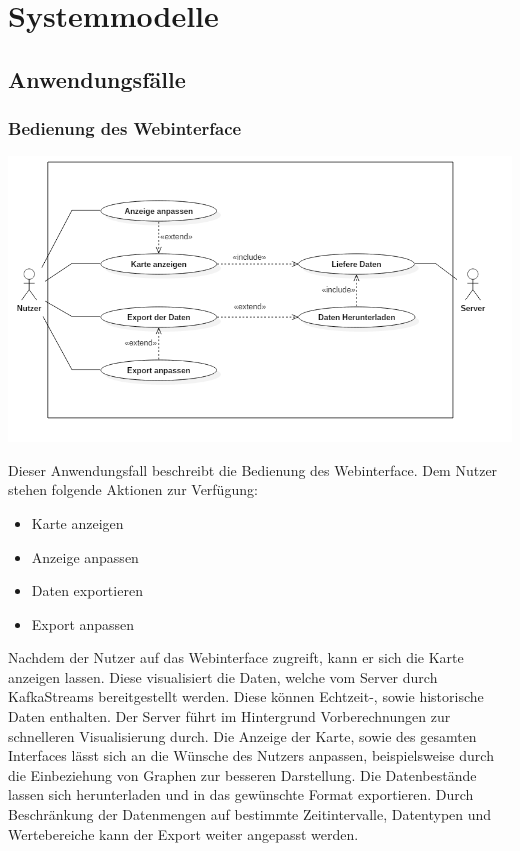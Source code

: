 \chapter{Systemmodelle}

\section{Anwendungsfälle}
    \subsection{Bedienung des Webinterface}
        \includegraphics[width=1\linewidth]{diagrams/UseCaseDiagram1.png}
       
       Dieser Anwendungsfall beschreibt die Bedienung des Webinterface. Dem Nutzer stehen folgende Aktionen zur Verfügung:
       \begin{itemize}
            \item Karte anzeigen
            \item Anzeige anpassen
            \item Daten exportieren
            \item Export anpassen
        \end{itemize}
        Nachdem der Nutzer auf das Webinterface zugreift, kann er sich die Karte anzeigen lassen. Diese visualisiert die Daten, welche 
        vom Server durch KafkaStreams bereitgestellt werden. Diese können Echtzeit-, sowie historische Daten enthalten.  Der Server führt 
        im Hintergrund Vorberechnungen zur schnelleren Visualisierung durch. Die Anzeige der Karte, sowie des gesamten Interfaces lässt sich 
        an die Wünsche des Nutzers anpassen, beispielsweise durch die Einbeziehung von Graphen zur besseren Darstellung. Die 
        Datenbestände lassen sich herunterladen und in das gewünschte Format exportieren. Durch Beschränkung der Datenmengen auf 
        bestimmte Zeitintervalle, Datentypen und Wertebereiche kann der Export weiter angepasst werden.
        
